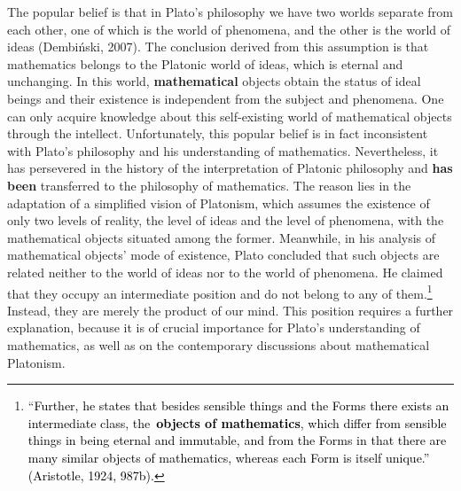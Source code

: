 \documentclass[a4paper]{article}
\newcommand\textstyleFootnoteCharacters[1]{\textsuperscript{#1}}
\newcommand\textstyleStrong[1]{\textbf{#1}}
\newcommand\textstyleInternetlink[1]{\textcolor{blue}{#1}}
\begin{document}
The popular belief is that in Plato’s philosophy we have two worlds separate from each other, one of which is the world
of phenomena, and the other is the world of ideas \label{ref:RNDr6IA7g3JQB}(Dembiński, 2007). The conclusion derived
from this assumption is that mathematics belongs to the Platonic world of ideas, which is eternal and unchanging. In
this world, \textbf{mathematical} objects obtain the status of ideal beings and their existence is independent from the
subject and phenomena. One can only acquire knowledge about this self-existing world of mathematical objects through
the intellect. Unfortunately, this popular belief is in fact inconsistent with Plato’s philosophy and his understanding
of mathematics. Nevertheless, it has persevered in the history of the interpretation of Platonic philosophy and
\textbf{has been }transferred to the philosophy of mathematics. The reason lies in the adaptation of a simplified
vision of Platonism, which assumes the existence of only two levels of reality, the level of ideas and the level of
phenomena, with the mathematical objects situated among the former. Meanwhile, in his analysis of mathematical objects'
mode of existence, Plato concluded that such objects are related neither to the world of ideas nor to the world of
phenomena. He claimed that they occupy an intermediate position and do not belong to any of them.\footnote{
“\textcolor{black}{Further, he states that besides sensible things and the Forms there exists an intermediate class,
the~}\textstyleStrong{\textmd{\textcolor{black}{objects of}}\textcolor{black}{
}\textmd{\textcolor{black}{mathematics}}}\textcolor{black}{,}\textstyleInternetlink{\textsuperscript{
}}\textcolor{black}{which differ from sensible things in being eternal and immutable, and from the Forms in that there
are many similar objects of mathematics, whereas each Form is itself unique.”
}\label{ref:RNDgQfk1ifbz1}\textcolor{black}{(Aristotle, 1924, 987b)}\textcolor{black}{.}}\textstyleFootnoteCharacters{
}Instead, they are merely the product of our mind. This position requires a further explanation, because it is of
crucial importance for Plato’s understanding of mathematics, as well as on the contemporary discussions about
mathematical Platonism.
\end{document}
